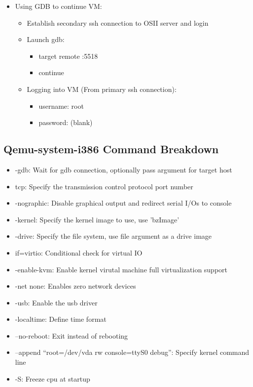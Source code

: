 \documentclass[letterpaper,10pt]{article}
\begin{document}
\begin{itemize}
\begin{itemize}
         \end{itemize}
    \item Using GDB to continue VM:
    \begin{itemize}
      \item Establish secondary ssh connection to OSII server and login
        \item Launch gdb:
        \begin{itemize}
          \item target remote :5518
            \item continue
        \end{itemize}
    \item Logging into VM (From primary ssh connection):
    \begin{itemize}
      \item username: root
        \item password: (blank)
    \end{itemize}
    \end{itemize}
\end{itemize}

\subsection{Qemu-system-i386 Command Breakdown}
\begin{itemize}
  \item -gdb: Wait for gdb connection, optionally pass argument for target host
    \item tcp: Specify the transmission control protocol port number
    \item -nographic: Disable graphical output and redirect serial I/Os to console
    \item -kernel: Specify the kernel image to use, use 'bzImage'
    \item -drive: Specify the file system, use file argument as a drive image
    \item if=virtio: Conditional check for virtual IO
    \item -enable-kvm: Enable kernel virutal machine full virtualization support
    \item -net none: Enables zero network devices
    \item -usb: Enable the usb driver
    \item -localtime: Define time format
    \item --no-reboot: Exit instead of rebooting
    \item --append ``root=/dev/vda rw console=ttyS0 debug'': Specify kernel command line
    \item -S: Freeze cpu at startup
\end{itemize}
\end{document}
